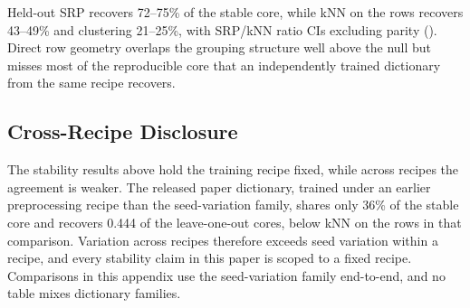 Held-out SRP recovers 72--75\% of the stable core, while kNN on the rows recovers
43--49\% and clustering 21--25\%, with SRP/kNN ratio CIs excluding
parity (). Direct row geometry overlaps
the grouping structure well above the null but misses most of the
reproducible core that an independently trained dictionary from the same recipe
recovers.

\subsection{Cross-Recipe Disclosure}
\label{app:basis-stability-cross-recipe}

The stability results above hold the training recipe fixed, while across
recipes the agreement is weaker. The released paper dictionary, trained
under an earlier preprocessing recipe than the seed-variation
family, shares only 36\% of the stable core and recovers 0.444 of
the leave-one-out cores, below kNN on the rows in that comparison. Variation
across recipes therefore exceeds seed variation within a recipe, and every
stability claim in this paper is scoped to a fixed recipe. Comparisons in
this appendix use the seed-variation family end-to-end, and no table mixes
dictionary families.
